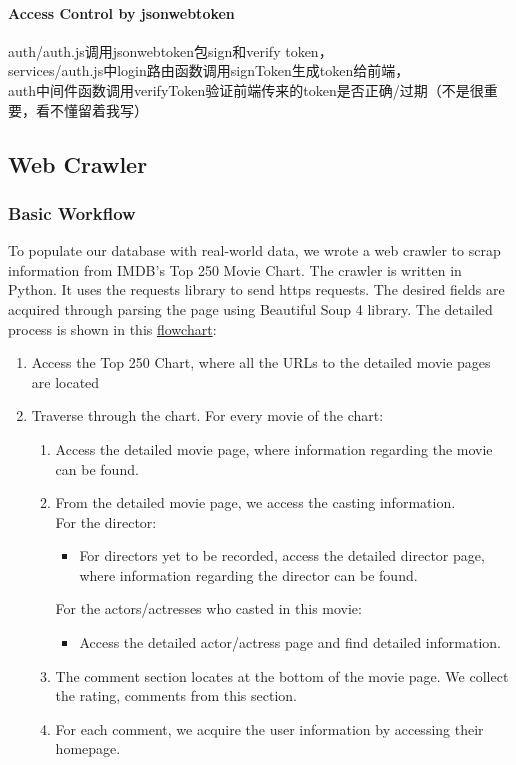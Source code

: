 \begin{CJK*}{UTF8}{gbsn}
\paragraph{Access Control by jsonwebtoken}
auth/auth.js调用jsonwebtoken包sign和verify token，\\
services/auth.js中login路由函数调用signToken生成token给前端，\\
auth中间件函数调用verifyToken验证前端传来的token是否正确/过期（不是很重要，看不懂留着我写）

\subsection{Web Crawler}
\subsubsection{Basic Workflow}
To populate our database with real-world data, we wrote a web crawler to scrap information from IMDB's Top 250 Movie Chart. The crawler is written in Python. It uses the requests library to send https requests. The desired fields are acquired through parsing the page using Beautiful Soup 4 library.
The detailed process is shown in this \hyperref[crawler]{flowchart}:\par

\begin{enumerate}
    \item Access the Top 250 Chart, where all the URLs to the detailed movie pages are located
    \item Traverse through the chart. For every movie of the chart:
    \begin{enumerate}
        \item Access the detailed movie page, where information regarding the movie can be found.
        \item From the detailed movie page, we access the casting information.\\ For the director:
        \begin{itemize}
            \item For directors yet to be recorded, access the detailed director page, where information regarding the director can be found.
        \end{itemize}
        For the actors/actresses who casted in this movie:
        \begin{itemize}
            \item Access the detailed actor/actress page and find detailed information.
        \end{itemize}
        \item The comment section locates at the bottom of the movie page. We collect the rating, comments from this section.
        \item For each comment, we acquire the user information by accessing their homepage.
    \end{enumerate}
\end{enumerate}


\end{CJK*}
